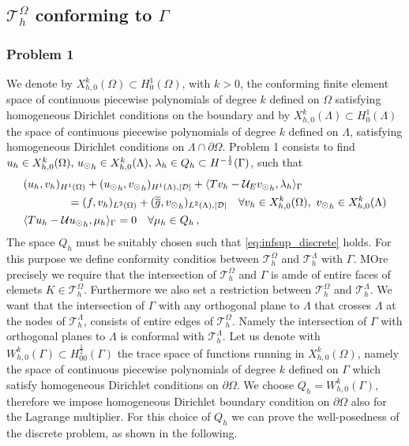 \subsection{$\mathcal{T}^{\Omega}_h$ conforming to $\Gamma$}
 
\subsubsection{Problem 1}
We denote by $X_{h,0}^k(\Omega)\subset H^1_0(\Omega)$, with $k>0$, the conforming finite element space of continuous piecewise polynomials of degree $k$ defined on $\Omega$ satisfying homogeneous Dirichlet conditions on the boundary and by $X_{h,0}^k(\Lambda)\subset H^1_0(\Lambda)$ the space of continuous piecewise polynomials of degree $k$ defined on $\Lambda$, satisfying homogeneous Dirichlet conditions on $\Lambda \cap \partial \Omega$. 
Problem 1 consists to find $u_h \in X_{h,0}^k (\Omega) ,\, {u_{\odot}}_h \in X_{h,0}^k(\Lambda) ,\, \lambda_h \in Q_h \subset H^{-\frac12}(\Gamma )$, such that
\begin{subequations}
\begin{align}
&(u_h,v_h)_{H^1(\Omega)} + ({u_{\odot}}_h,{v_{\odot}}_h)_{H^1(\Lambda),|\mathcal{D}|} 
+ \langle T v_h  - \mathcal{U}_E {v_{\odot}}_h, \lambda_h \rangle_\Gamma 
\\
\nonumber
&\qquad\qquad= (f,v_h)_{L^2(\Omega)} + (\overline{\overline{g}},{v_{\odot}}_h)_{L^2(\Lambda),|\mathcal{D}|}
\quad \forall v_h \in X_{h,0}^k(\Omega), \ {v_{\odot}}_h \in X_{h,0}^k(\Lambda)
\\
&   \langle T u_h - \mathcal{U} {u_{\odot}}_h , \mu_h \rangle_\Gamma = 0
\quad \forall \mu_h \in Q_h\,,
\end{align}
\end{subequations}
The space $Q_h$ must be suitably chosen such that \eqref{eq:infsup_discrete} holds. {\color{red}For this purpose we define conformity conditios between $\mathcal{T}^{\Omega}_h$ and $\mathcal{T}^{\Lambda}_h$ with $\Gamma$. MOre precisely we require that the intersection of $\mathcal{T}^{\Omega}_h$ and $\Gamma$ is amde of entire faces of elemets $K \in \mathcal{T}^{\Omega}_h$. Furthermore we also set a restriction between $\mathcal{T}^{\Omega}_h$ and $\mathcal{T}^{\Lambda}_h$. We want that the intersection of $\Gamma$ with any orthogonal plane to $\Lambda$ that crosses $\Lambda$ at the nodes of $\mathcal{T}^{\Lambda}_h$, consists of entire edges of $\mathcal{T}^{\Omega}_h$. Namely the intersection of $\Gamma$ with orthogonal planes to $\Lambda$ is conformal with $\mathcal{T}^{\Lambda}_h$.} Let us denote with $W_{h,0}^k(\Gamma) \subset H^{\frac 12}_{00}(\Gamma)$ the trace space of functions running in $X_{h,0}^k(\Omega)$, namely the space of continuous piecewise polynomials of degree $k$ defined on $\Gamma$ which satisfy homogeneous Dirichlet conditions on $\partial \Omega$. We choose $Q_h=W_{h,0}^k(\Gamma)$, therefore we impose homogeneous Dirichlet boundary condition on $\partial \Omega$ also for the Lagrange multiplier. For this choice of $Q_h$ we can prove the well-posedness of the discrete problem, as shown in the following. 

